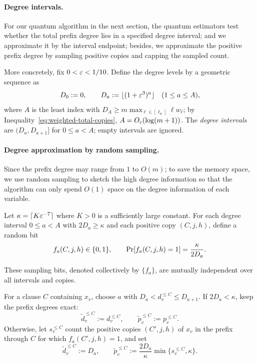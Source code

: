 \paragraph{Degree intervals.} For our quantum algorithm in the next section,  
the quantum estimators test whether the total prefix degree lies in a specified degree interval; 
and  we approximate it by the interval  endpoint; besides, we  approximate the positive prefix degree by sampling positive copies and capping the sampled count.



More concretely,  fix $0<\varepsilon<1/10$. Define the degree levels by a geometric sequence as
\[
  D_0:=0,\qquad D_a:=\lfloor(1+\varepsilon^3)^a\rfloor\quad(1\le a\le A),
\]
where $A$ is the least index with $D_A\ge m\max_{\ell\in[\ell_0]}\ell w_\ell$; by Inequality~\eqref{eq:weighted-total-copies}, $A=O_\varepsilon(\log(m+1))$.
The \textit{degree intervals} are $(D_a,D_{a+1}]$ for $0\le a<A$; empty intervals are ignored.







\paragraph{Degree  approximation by random sampling.} 
Since the prefix  degree may  range from $1$ to $O(m)$; to save the memory space, we use random sampling to sketch the high degree information so that the algorithm can only spend $O(1)$ space on the degree information of each variable.


Let $\kappa = \lceil K\varepsilon^{-7} \rceil $ where $K>0$ is a sufficiently large constant.
For each degree interval $0\le a<A$ with $2D_a\ge\kappa$ and each positive copy $(C,j,h)$,
define a random bit
\begin{equation}
    \label{eq:random_sampling}
    f_a(C,j,h)\in\{0,1\},\qquad \Pr[f_a(C,j,h)=1] =\frac{\kappa}{2D_a}.
\end{equation}

These sampling bits, denoted collectively by $\{f_a\}$, are mutually independent over all intervals and copies.

For a clause $C$ containing $x_v$, choose $a$ with $D_a<d_v^{\le C}\le D_{a+1}$.
If $2D_a<\kappa$, keep the prefix degrees exact:
\[
  \widetilde d_v^{\le C}:=d_v^{\le C},\qquad
  \widetilde p_v^{\le C}:=p_v^{\le C}.
\]
Otherwise, let $s_v^{\le C}$ count the positive copies $(C',j,h)$ of $x_v$ in the prefix through $C$ for which $f_a(C',j,h)=1$, and set
\[
  \widetilde d_v^{\le C}:=D_a,\qquad
  \widetilde p_v^{\le C}:=\frac{2D_a}{\kappa}\min\{s_v^{\le C},\kappa\}.
\]


